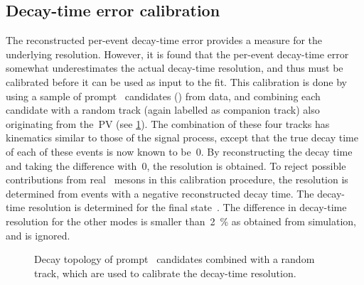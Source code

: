 \subsection{Decay-time error calibration} \label{sec:BsDsK_TD_Res_Calib}
The reconstructed per-event decay-time error provides a measure for the underlying resolution.
However, it is found that the per-event decay-time error somewhat underestimates the actual decay-time resolution, and thus must be calibrated before it can be used as input to the fit.
This calibration is done by using a sample of prompt \Dspm~candidates (\DspmKKPi) from data, and combining each candidate with a random track (again labelled as companion track) also originating from the~PV (see \cref{fig:BsDsK_TD_Res_Topology}).
The combination of these four tracks has kinematics similar to those of the signal process, except that the true decay time of each of these events is now known to be~\num{0}.
By reconstructing the decay time and taking the difference with~\num{0}, the resolution is obtained.
To reject possible contributions from real \Bs~mesons in this calibration procedure, the resolution is determined from events with a negative reconstructed decay time.
The decay-time resolution is determined for the final state~\DspmKKPi.
The difference in decay-time resolution for the other modes is smaller than~\SI{2}{\percent} as obtained from simulation, and is ignored.

\begin{figure}[htb] \centerfloat
    \caption{
        Decay topology of prompt \Dspm~candidates combined with a random track, which are used to calibrate the decay-time resolution.}
    \label{fig:BsDsK_TD_Res_Topology}
\end{figure}

